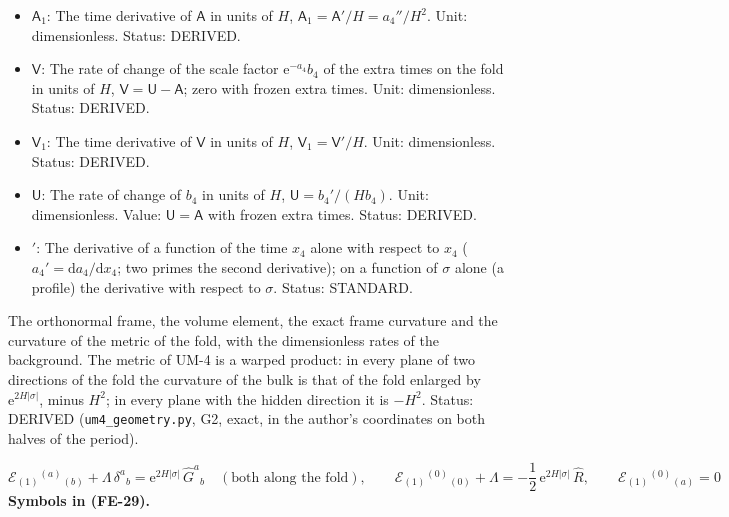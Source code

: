 \documentclass[
  10pt,
]{article}
\begin{document}
\begin{itemize}
  constant); the first-order equations of the fold hold for
  \(\mathsf{A}^2 \ll 1\); 1 at the author's vacuum, which is not a
  solution of UM-4. Status: DERIVED.
\item
  \(\mathsf{A}_1\): The time derivative of \(\mathsf{A}\) in units of
  \(H\), \(\mathsf{A}_1 = \mathsf{A}'/H = a_4''/H^2\). Unit:
  dimensionless. Status: DERIVED.
\item
  \(\mathsf{V}\): The rate of change of the scale factor
  \(\mathrm{e}^{-a_4}b_4\) of the extra times on the fold in units of
  \(H\), \(\mathsf{V} = \mathsf{U} - \mathsf{A}\); zero with frozen
  extra times. Unit: dimensionless. Status: DERIVED.
\item
  \(\mathsf{V}_1\): The time derivative of \(\mathsf{V}\) in units of
  \(H\), \(\mathsf{V}_1 = \mathsf{V}'/H\). Unit: dimensionless. Status:
  DERIVED.
\item
  \(\mathsf{U}\): The rate of change of \(b_4\) in units of \(H\),
  \(\mathsf{U} = b_4'/(Hb_4)\). Unit: dimensionless. Value:
  \(\mathsf{U} = \mathsf{A}\) with frozen extra times. Status: DERIVED.
\item
  \({}'\): The derivative of a function of the time \(x_4\) alone with
  respect to \(x_4\) (\(a_4' = \mathrm{d}a_4/\mathrm{d}x_4\); two primes
  the second derivative); on a function of \(\sigma\) alone (a profile)
  the derivative with respect to \(\sigma\). Status: STANDARD.
\end{itemize}

The orthonormal frame, the volume element, the exact frame curvature and
the curvature of the metric of the fold, with the dimensionless rates of
the background. The metric of UM-4 is a warped product: in every plane
of two directions of the fold the curvature of the bulk is that of the
fold enlarged by \(\mathrm{e}^{2H\lvert\sigma\rvert}\), minus \(H^2\);
in every plane with the hidden direction it is \(-H^2\). Status: DERIVED
(\texttt{um4\_geometry.py}, G2, exact, in the author's coordinates on
both halves of the period).

\[
\mathcal{E}_{(1)}{}^{(a)}{}_{(b)} + \Lambda\,\delta^a{}_b = \mathrm{e}^{2H\lvert\sigma\rvert}\,\hat G^a{}_b\quad(\text{both along the fold}),\qquad
\mathcal{E}_{(1)}{}^{(0)}{}_{(0)} + \Lambda = -\frac12\,\mathrm{e}^{2H\lvert\sigma\rvert}\,\hat R,\qquad
\mathcal{E}_{(1)}{}^{(0)}{}_{(a)} = 0 \tag{FE-29}
\] \textbf{Symbols in (FE-29).}
\end{document}
